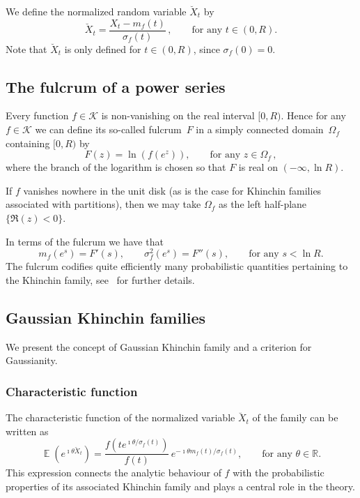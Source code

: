 \documentclass[12pt]{amsart}
\theoremstyle{definition}
\DeclareMathOperator{\E}{\mathbb{E}}
\begin{document}
We define the normalized random variable $\breve{X}_t$ by
\[
\breve{X}_t = \frac{X_t - m_f(t)}{\sigma_f(t)}\,, \qquad \text{for any } t\in(0,R).
\]
Note that $\breve{X}_t$ is only defined for $t\in(0,R)$, since $\sigma_f(0)=0$.


\subsection{The fulcrum of a power series}\label{subsec:fulcrum}

Every function $f\in\mathcal{K}$ is non-vanishing on the
real interval $[0,R)$. Hence for any $f\in\mathcal{K}$ we can define its so-called fulcrum~$F$ in a
simply connected domain~$\Omega_f$ containing $[0,R)$ by
\[
F(z) = \ln(f(e^z)), \qquad \text{for any } z\in\Omega_f\,,
\]
where the branch of the logarithm is chosen so that $F$ is real on $(-\infty,\ln R)$.
\smallskip

If $f$ vanishes nowhere in the unit disk (as is the case for Khinchin families associated
with partitions), then we may take $\Omega_f$ as the left half-plane $\{\Re(z)<0\}$.
\smallskip

In terms of the fulcrum we have that
\[
m_f(e^s) = F'(s), \qquad \sigma_f^2(e^s) = F''(s), \qquad \text{for any } s < \ln R.
\]
The fulcrum codifies quite efficiently many probabilistic quantities pertaining to the
Khinchin family, see~\cite{CFMK, CFMK2, CFMK3, MaciaGaussianity} for further details.


\subsection{Gaussian Khinchin families}\label{subsec:Gaussian}

We present the concept of Gaussian Khinchin family and a criterion for Gaussianity.


\subsubsection{Characteristic function}\label{subsubsec:charfn}

The characteristic function of the normalized variable $\breve{X}_t$
of the family can be written as
\[
\E(e^{\imath\theta \breve{X}_t}) = \frac{f(t e^{\imath\theta/\sigma_f(t)})}{f(t)}\, e^{-\imath\theta m_f(t)/\sigma_f(t)}, \qquad \text{for any } \theta\in\mathbb{R}.
\]
This expression connects the analytic behaviour of $f$ with the probabilistic properties
of its associated Khinchin family and plays a central role in the theory.
\smallskip
\end{document}
